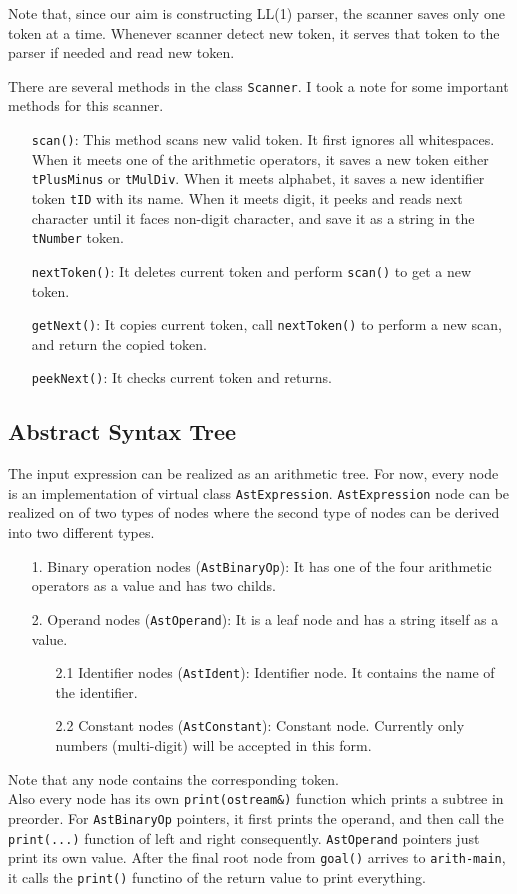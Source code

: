 \documentclass[11pt]{article}
\begin{document}
Note that, since our aim is constructing LL(1) parser, the scanner saves only one token at a time. Whenever scanner detect new token, it serves that token to the parser if needed and read new token.

There are several methods in the class \texttt{Scanner}. I took a note for some important methods for this scanner.
\begin{itemize}
	\item [\texttt{scan()}:] This method scans new valid token. It first ignores all whitespaces. When it meets one of the arithmetic operators, it saves a new token either \texttt{tPlusMinus} or \texttt{tMulDiv}. When it meets alphabet, it saves a new identifier token \texttt{tID} with its name. When it meets digit, it peeks and reads next character until it faces non-digit character, and save it as a string in the \texttt{tNumber} token.
	\item [\texttt{nextToken()}:] It deletes current token and perform \texttt{scan()} to get a new token.
	\item [\texttt{getNext()}:] It copies current token, call \texttt{nextToken()} to perform a new scan, and return the copied token.
	\item [\texttt{peekNext()}:] It checks current token and returns.
\end{itemize}

\subsection{Abstract Syntax Tree} \label{ssec:2.2}
The input expression can be realized as an arithmetic tree. For now, every node is an implementation of virtual class \texttt{AstExpression}. \texttt{AstExpression} node can be realized on of two types of nodes where the second type of nodes can be derived into two different types.
\begin{itemize}
	\item [1.] Binary operation nodes (\texttt{AstBinaryOp}): It has one of the four arithmetic operators as a value and has two childs.
	\item [2.] Operand nodes (\texttt{AstOperand}): It is a leaf node and has a string itself as a value.
	\begin{itemize}
		\item [2.1] Identifier nodes (\texttt{AstIdent}): Identifier node. It contains the name of the identifier.
		\item [2.2] Constant nodes (\texttt{AstConstant}): Constant node. Currently only numbers (multi-digit) will be accepted in this form.
	\end{itemize}
\end{itemize}
Note that any node contains the corresponding token. \\
Also every node has its own \texttt{print(ostream\&)} function which prints a subtree in preorder. For \texttt{AstBinaryOp} pointers, it first prints the operand, and then call the \texttt{print(...)} function of left and right consequently. \texttt{AstOperand} pointers just print its own value. After the final root node from \texttt{goal()} arrives to \texttt{arith-main}, it calls the \texttt{print()} functino of the return value to print everything.
\end{document}
